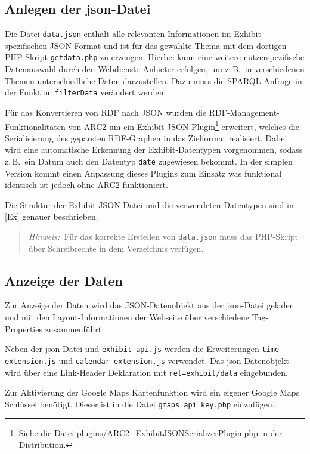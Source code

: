 \documentclass[11pt,a4paper]{article}
\begin{document}
\subsection{Anlegen der json-Datei}

Die Datei \texttt{data.json} enthält alle relevanten Informationen im
Exhibit-spezifischen JSON-Format und ist für das gewählte Thema mit dem
dortigen PHP-Skript \texttt{getdata.php} zu erzeugen.  Hierbei kann eine
weitere nutzerspezifische Datenauswahl durch den Webdienste-Anbieter erfolgen,
um z.\,B.\ in verschiedenen Themen unterschiedliche Daten darzustellen. Dazu
muss die SPARQL-Anfrage in der Funktion \texttt{filterData} verändert werden.

Für das Konvertieren von RDF nach JSON wurden die
RDF-Management-Funktionalitäten von ARC2 um ein
Exhibit-JSON-Plugin\footnote{Siehe die Datei
  \url{plugins/ARC2_ExhibitJSONSerializerPlugin.php} in der Distribution.}
erweitert, welches die Serialisierung des geparsten RDF-Graphen in das
Zielformat realisiert.  Dabei wird eine automatische Erkennung der
Exhibit-Datentypen vorgenommen, sodass z.\,B.\ ein Datum auch den Datentyp
\texttt{date} zugewiesen bekommt. In der simplen Version kommt einen Anpassung dieses
Plugins zum Einsatz was funktional identisch ist jedoch ohne ARC2 funktioniert.

Die Struktur der Exhibit-JSON-Datei und die verwendeten Datentypen sind in
[Ex] genauer beschrieben.
\begin{quote}
  \emph{Hinweis:}\ Für das korrekte Erstellen von \texttt{data.json} muss das
  PHP-Skript über {Schreibrechte} in dem Verzeichnis verfügen.
\end{quote}

\subsection{Anzeige der Daten}

Zur Anzeige der Daten wird das JSON-Datenobjekt aus der json-Datei geladen und
mit den Layout-Informationen der Webseite über verschiedene Tag-Properties
zusammenführt.

Neben der json-Datei und \texttt{exhibit-api.js} werden die Erweiterungen
\texttt{time-extension.js} und \texttt{calendar-extension.js} verwendet.
Das json-Datenobjekt wird über eine Link-Header Deklaration mit
\texttt{rel={\dq}exhibit/data{\dq}} eingebunden. 

Zur Aktivierung der Google Maps Kartenfunktion wird ein eigener Google Maps
Schlüssel benötigt. Dieser ist in die Datei \texttt{gmaps\_api\_key.php}
einzufügen.
\end{document}
